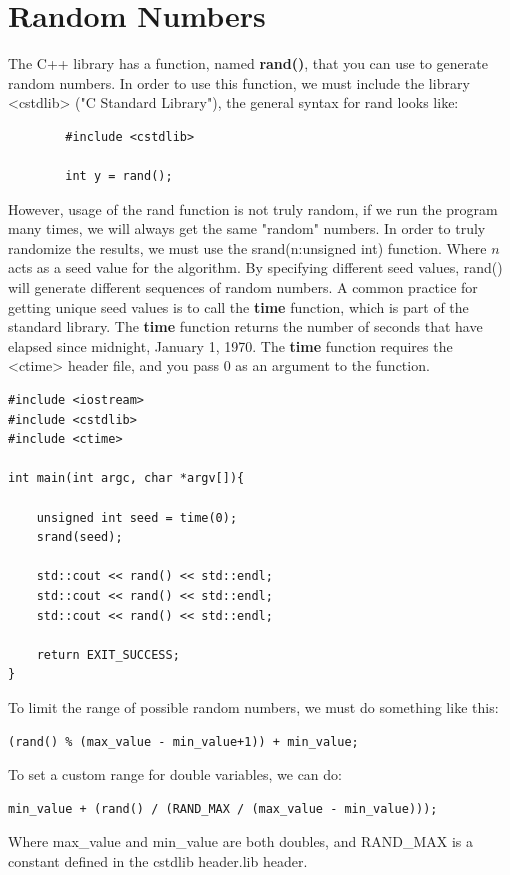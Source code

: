\documentclass{report}
\begin{document}
    \section{\LARGE Random Numbers}
    \bigbreak \noindent 
    The C++ library has a function, named \textbf{rand()}, that you can use to generate random numbers. In order to use this function, we must include the library <cstdlib> ("C Standard Library"), the general syntax for rand looks like:
    \smallbreak \noindent
    \sepline
    \begin{verbatim}
        #include <cstdlib>
        
        int y = rand();
    \end{verbatim}
    \sepline
    \bigbreak \noindent 
    However, usage of the rand function is not truly random, if we run the program many times, we will always get the same "random" numbers. In order to truly randomize the results, we must use the srand(n:unsigned int) function. Where $n$ acts as a seed value for the algorithm. By specifying different seed values, rand() will generate different sequences of random numbers.
    \bigbreak \noindent 
    A common practice for getting unique seed values is to call the \textbf{time} function, which is part of the standard library. The \textbf{time} function returns the number of seconds that have elapsed since midnight, January 1, 1970. The \textbf{time} function requires the <ctime> header file, and you pass 0 as an argument to the function.
    \smallbreak \noindent
    \sepline
    \begin{verbatim}
#include <iostream>
#include <cstdlib>
#include <ctime>

int main(int argc, char *argv[]){

    unsigned int seed = time(0);
    srand(seed);

    std::cout << rand() << std::endl; 
    std::cout << rand() << std::endl; 
    std::cout << rand() << std::endl; 

    return EXIT_SUCCESS;
}
    \end{verbatim}
    \sepline
    \bigbreak \noindent 
    To limit the range of possible random numbers, we must do something like this:
    \smallbreak \noindent
    \sepline
    \begin{verbatim}
(rand() % (max_value - min_value+1)) + min_value;   
    \end{verbatim}
    \sepline
    \bigbreak \noindent 
    To set a custom range for double variables, we can do:
    \bigbreak \noindent 
    \sepline
    \begin{verbatim}
min_value + (rand() / (RAND_MAX / (max_value - min_value)));
    \end{verbatim}
    \sepline
    \bigbreak \noindent 
    Where max\_value and min\_value are both doubles, and RAND\_MAX is a constant defined in the cstdlib header.lib header.
\end{document}
